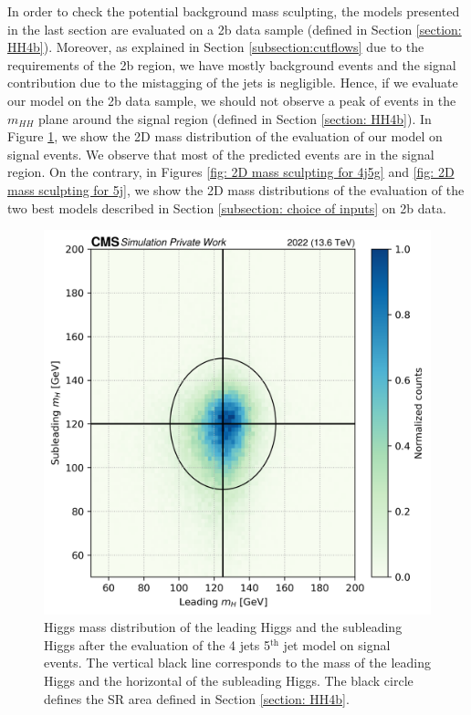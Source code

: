 In order to check the potential background mass sculpting, the models presented in the last section are evaluated on a 2b data sample (defined in Section \ref{section: HH4b}). Moreover, as explained in Section \ref{subsection:cutflows} due to the requirements of the 2b region, we have mostly background events and the signal contribution due to the mistagging of the jets is negligible. Hence, if we evaluate our model on the 2b data sample, we should not observe a peak of events in the $m_{HH}$ plane around the signal region (defined in Section \ref{section: HH4b}). In Figure \ref{fig: 2D mass dist sig}, we show the 2D mass distribution of the evaluation of our model on signal events. We observe that most of the predicted events are in the signal region. On the contrary, in Figures \ref{fig: 2D mass sculpting for 4j5g} and \ref{fig: 2D mass sculpting for 5j}, we show the 2D mass distributions of the evaluation of the two best models described in Section \ref{subsection: choice of inputs} on 2b data.


\begin{figure}[hbt]
    \centering
    \includegraphics[width=0.6\linewidth]{Images/6.Improving/Mass sculpting/signal mhh.png}
    \caption{Higgs mass distribution of the leading Higgs and the subleading Higgs after the evaluation of the 4 jets 5$^{\text{th}}$ jet model on signal events. The vertical black line corresponds to the mass of the leading Higgs and the horizontal of the subleading Higgs. The black circle defines the SR area defined in Section \ref{section: HH4b}.}
    \label{fig: 2D mass dist sig}
\end{figure}



